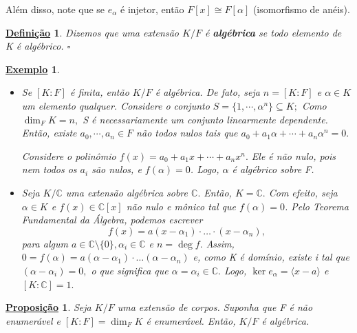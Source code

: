 \documentclass{article}
\newtheorem*{def*}{\underline{Defini\c c\~ao}}
\newtheorem*{prop*}{\underline{Proposi\c c\~ao}}
\newtheorem{example}{\underline{Exemplo}}
\begin{document}
Além disso, note que se \(e_{\alpha }\) é injetor, então \(F[x]\cong{F[\alpha ]}\) (isomorfismo de anéis).
\begin{def*}
  Dizemos que uma extensão \(K/F\) é \textbf{algébrica} se todo elemento de K é algébrico. \(\square\)
\end{def*}
\begin{example}
  \begin{itemize}
    \item[1)] Se \([K:F]\) é finita, então \(K/F\) é algébrica. De fato, seja \(n=[K:F]\) e \(\alpha \in K\) um elemento qualquer.
      Considere o conjunto \(S = \{1, \cdots, \alpha ^{n}\}\subseteq{K};\) Como \(\dim_{F}K = n,\) S é necessariamente um conjunto linearmente
      dependente. Então, existe \(a_{0}, \cdots, a_{n}\in F\) não todos nulos tais que \(a_{0} + a_{1}\alpha + \cdots + a_{n}\alpha^{n} = 0.\)

      Considere o polinômio \(f(x) = a_{0}+a_{1}x + \cdots + a_{n}x^{n}.\) Ele é não nulo, pois nem todos os \(a_{i}\) são nulos,
      e \(f(\alpha ) = 0\). Logo, \(\alpha \) é algébrico sobre F.

    \item[2)] Seja \(K/\mathbb{C}\) uma extensão algébrica sobre \(\mathbb{C}.\) Então, \(K = \mathbb{C}.\) Com efeito, seja \(\alpha \in K\)
      e \(f(x)\in \mathbb{C}[x]\) não nulo e mônico tal que \(f(\alpha ) = 0\). Pelo Teorema Fundamental da Álgebra, podemos escrever 
      \[
        f(x) = a(x-\alpha_{1})\cdot \dotsc \cdot (x-\alpha_{n}),
      \]
      para algum \(a\in \mathbb{C}\setminus{\{0\}},\alpha_{i}\in \mathbb{C}\) e \(n = \deg{f}.\) Assim, \(0 = f(\alpha ) = a(\alpha -\alpha_{1})\cdot \dotsc(\alpha -\alpha_{n})\)
      e, como K é domínio, existe i tal que \((\alpha -\alpha_{i})=0,\) o que significa que \(\alpha=\alpha_{i}\in \mathbb{C}.\) Logo, \(\ker{e_{\alpha }}=\langle x-a \rangle\) e \([K:\mathbb{C}] = 1.\)
  \end{itemize}
\end{example}
\begin{prop*}
  Seja \(K/F\) uma extensão de corpos. Suponha que F é não enumerável e \([K:F]=\dim_{F}K\) é enumerável. Então,
  \(K/F\) é algébrica.
\end{prop*}
\end{document}
